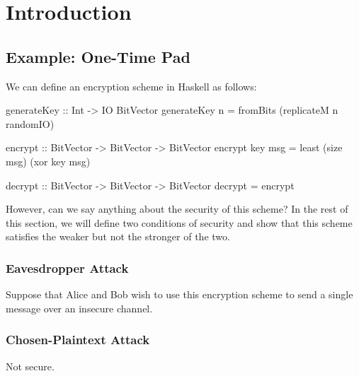 \chapter{Introduction}



\section{Example: One-Time Pad}

We can define an encryption scheme in Haskell as follows:
\begin{code}
    generateKey :: Int -> IO BitVector
    generateKey n = fromBits (replicateM n randomIO)

    encrypt :: BitVector -> BitVector -> BitVector
    encrypt key msg = least (size msg) (xor key msg)

    decrypt :: BitVector -> BitVector -> BitVector
    decrypt = encrypt
\end{code}

However, can we say anything about the security of this scheme?  In the rest of this section, we will define two
conditions of security and show that this scheme satisfies the weaker but not the stronger of the two.


\subsection{Eavesdropper Attack}

Suppose that Alice and Bob wish to use this encryption scheme to send a single message over an insecure channel.  

\subsection{Chosen-Plaintext Attack}

Not secure.


